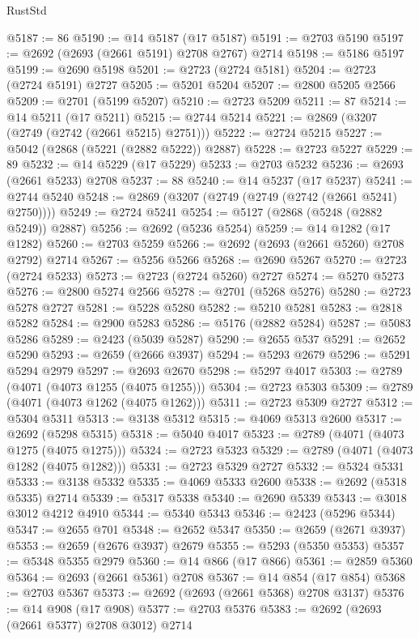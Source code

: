 \begin{lexlean}{RustStd}
\begin{coremodule}
@5187 := 86
@5190 := @14 @5187 (@17 @5187)
@5191 := @2703 @5190
@5197 := @2692 (@2693 (@2661 @5191) @2708 @2767) @2714
@5198 := @5186 @5197
@5199 := @2690 @5198
@5201 := @2723 (@2724 @5181)
@5204 := @2723 (@2724 @5191) @2727
@5205 := @5201 @5204
@5207 := @2800 @5205 @2566
@5209 := @2701 (@5199 @5207)
@5210 := @2723 @5209
@5211 := 87
@5214 := @14 @5211 (@17 @5211)
@5215 := @2744 @5214
@5221 := @2869 (@3207 (@2749 (@2742 (@2661 @5215) @2751)))
@5222 := @2724 @5215
@5227 := @5042 (@2868 (@5221 (@2882 @5222)) @2887)
@5228 := @2723 @5227
@5229 := 89
@5232 := @14 @5229 (@17 @5229)
@5233 := @2703 @5232
@5236 := @2693 (@2661 @5233) @2708
@5237 := 88
@5240 := @14 @5237 (@17 @5237)
@5241 := @2744 @5240
@5248 := @2869 (@3207 (@2749 (@2749 (@2742 (@2661 @5241) @2750))))
@5249 := @2724 @5241
@5254 := @5127 (@2868 (@5248 (@2882 @5249)) @2887)
@5256 := @2692 (@5236 @5254)
@5259 := @14 @1282 (@17 @1282)
@5260 := @2703 @5259
@5266 := @2692 (@2693 (@2661 @5260) @2708 @2792) @2714
@5267 := @5256 @5266
@5268 := @2690 @5267
@5270 := @2723 (@2724 @5233)
@5273 := @2723 (@2724 @5260) @2727
@5274 := @5270 @5273
@5276 := @2800 @5274 @2566
@5278 := @2701 (@5268 @5276)
@5280 := @2723 @5278 @2727
@5281 := @5228 @5280
@5282 := @5210 @5281
@5283 := @2818 @5282
@5284 := @2900 @5283
@5286 := @5176 (@2882 @5284)
@5287 := @5083 @5286
@5289 := @2423 (@5039 @5287)
@5290 := @2655 @537
@5291 := @2652 @5290
@5293 := @2659 (@2666 @3937)
@5294 := @5293 @2679
@5296 := @5291 @5294 @2979
@5297 := @2693 @2670
@5298 := @5297 @4017
@5303 := @2789 (@4071 (@4073 @1255 (@4075 @1255)))
@5304 := @2723 @5303
@5309 := @2789 (@4071 (@4073 @1262 (@4075 @1262)))
@5311 := @2723 @5309 @2727
@5312 := @5304 @5311
@5313 := @3138 @5312
@5315 := @4069 @5313 @2600
@5317 := @2692 (@5298 @5315)
@5318 := @5040 @4017
@5323 := @2789 (@4071 (@4073 @1275 (@4075 @1275)))
@5324 := @2723 @5323
@5329 := @2789 (@4071 (@4073 @1282 (@4075 @1282)))
@5331 := @2723 @5329 @2727
@5332 := @5324 @5331
@5333 := @3138 @5332
@5335 := @4069 @5333 @2600
@5338 := @2692 (@5318 @5335) @2714
@5339 := @5317 @5338
@5340 := @2690 @5339
@5343 := @3018 @3012 @4212 @4910
@5344 := @5340 @5343
@5346 := @2423 (@5296 @5344)
@5347 := @2655 @701
@5348 := @2652 @5347
@5350 := @2659 (@2671 @3937)
@5353 := @2659 (@2676 @3937) @2679
@5355 := @5293 (@5350 @5353)
@5357 := @5348 @5355 @2979
@5360 := @14 @866 (@17 @866)
@5361 := @2859 @5360
@5364 := @2693 (@2661 @5361) @2708
@5367 := @14 @854 (@17 @854)
@5368 := @2703 @5367
@5373 := @2692 (@2693 (@2661 @5368) @2708 @3137)
@5376 := @14 @908 (@17 @908)
@5377 := @2703 @5376
@5383 := @2692 (@2693 (@2661 @5377) @2708 @3012) @2714

\end{coremodule}
\end{lexlean}
